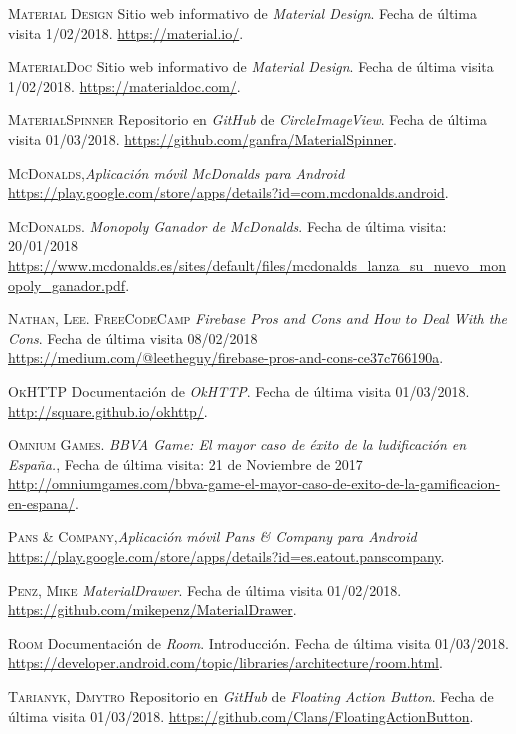 \documentclass[twoside]{report}
\begin{document}
\begin{thebibliography}{a}
 \textsc{Material Design} 
Sitio web informativo de \textit{Material Design}. Fecha de última visita 1/02/2018. \url{https://material.io/}.

 \textsc{MaterialDoc} 
Sitio web informativo de \textit{Material Design}. Fecha de última visita 1/02/2018. \url{https://materialdoc.com/}.

 \textsc{MaterialSpinner} 
Repositorio en \textit{GitHub} de \textit{CircleImageView}. Fecha de última visita 01/03/2018. \url{https://github.com/ganfra/MaterialSpinner}.

 \textsc{McDonalds},\textit{Aplicación móvil McDonalds para \textit{Android}} \url{https://play.google.com/store/apps/details?id=com.mcdonalds.android}.

 \textsc{McDonalds}. \textit{Monopoly Ganador de McDonalds}. Fecha de última visita: 20/01/2018 \url{https://www.mcdonalds.es/sites/default/files/mcdonalds_lanza_su_nuevo_monopoly_ganador.pdf}.

 \textsc{Nathan, Lee. FreeCodeCamp} \textit{Firebase Pros and Cons and How to Deal With the Cons}. Fecha de última visita 08/02/2018 \url{https://medium.com/@leetheguy/firebase-pros-and-cons-ce37c766190a}.

 \textsc{OkHTTP} 
Documentación de \textit{OkHTTP}. Fecha de última visita 01/03/2018. \url{http://square.github.io/okhttp/}.

 \textsc{Omnium Games.} \textit{BBVA Game: El mayor caso de éxito de la ludificación en España.}, Fecha de última visita: 21 de Noviembre de 2017 \url{http://omniumgames.com/bbva-game-el-mayor-caso-de-exito-de-la-gamificacion-en-espana/}. 

 \textsc{Pans \& Company},\textit{Aplicación móvil Pans \& Company para Android} \url{https://play.google.com/store/apps/details?id=es.eatout.panscompany}.

 \textsc{Penz, Mike} \textit{MaterialDrawer}. Fecha de última visita 01/02/2018. \url{https://github.com/mikepenz/MaterialDrawer}.

 \textsc{Room} 
Documentación de \textit{Room}. Introducción. Fecha de última visita 01/03/2018. \url{https://developer.android.com/topic/libraries/architecture/room.html}.

 \textsc{Tarianyk, Dmytro} 
Repositorio en \textit{GitHub} de \textit{Floating Action Button}. Fecha de última visita 01/03/2018. \url{https://github.com/Clans/FloatingActionButton}.


\end{thebibliography}
\end{document}
